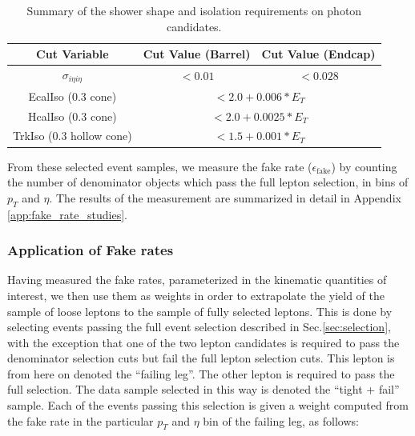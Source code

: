 \begin{table}[!ht]
\begin{center}
\begin{tabular}{|c|c|c|}
\hline
 Cut Variable           &   Cut Value (Barrel)        & Cut Value (Endcap)     \\
\hline
 $\sigma_{i\eta i\eta}$      &   $<0.01$              & $<0.028$               \\ 
\hline
 EcalIso (0.3 cone)          &   \multicolumn{2}{|c|}{$<2.0 + 0.006*E_{T}$}    \\ 
 HcalIso (0.3 cone)          &   \multicolumn{2}{|c|}{$<2.0 + 0.0025*E_{T}$}   \\ 
 TrkIso (0.3 hollow cone)    &   \multicolumn{2}{|c|}{$<1.5 + 0.001*E_{T}$}    \\ 
\hline
\end{tabular}
\caption{Summary of the shower shape and isolation requirements on 
photon candidates. \label{tab:photonOfflineSelection}}
\end{center}
\end{table}

From these selected event samples, we measure the fake rate 
($\epsilon_{\mathrm{fake}}$) by counting the number of denominator 
objects which pass the full lepton selection, in bins of $p_{T}$
and $\eta$. The results of the measurement are summarized in detail
in Appendix \ref{app:fake_rate_studies}.



\subsubsection{Application of Fake rates}
\label{sec:fakerateApplication}

Having measured the fake rates, parameterized in the kinematic quantities of interest,
we then use them as weights in order to extrapolate the yield of the sample of loose
leptons to the sample of fully selected leptons. This is done by selecting events
passing the full event selection described in Sec.\ref{sec:selection}, 
with the exception that one of the two lepton
candidates is required to pass the denominator selection cuts but fail the full 
lepton selection cuts. This lepton is from here on denoted the ``failing leg''. 
The other lepton is required to pass the full selection.
The data sample selected in this way is denoted the ``tight + fail'' sample.
Each of the events passing this selection is given a weight computed from
the fake rate in the particular $p_{T}$ and $\eta$ bin of the 
failing leg, as follows:

